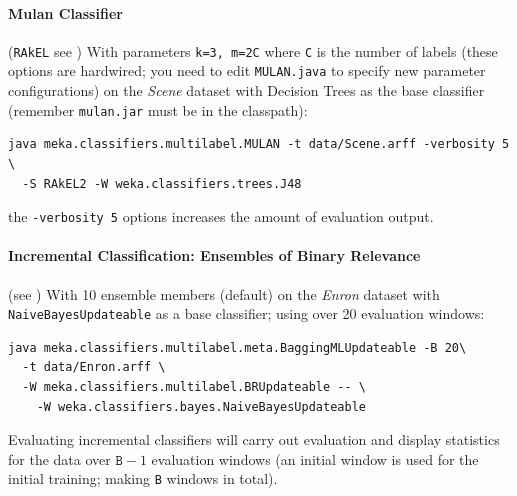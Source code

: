 \documentclass[11pt]{article}
\newcommand{\MEKA}{Meka}
\newcommand{\MOA}{Moa}
\begin{document}
\paragraph{Mulan Classifier} (\texttt{RAkEL} see \cite{RAKEL}) With parameters \texttt{\texttt{k=3}, \texttt{m=2C}} where \texttt{C} is the number of labels (these options are hardwired; you need to edit \texttt{MULAN.java} to specify new parameter configurations) on the \textit{Scene} dataset with Decision Trees as the base classifier (remember {\texttt{mulan.jar} must be in the classpath}):
\begin{lstlisting}
java meka.classifiers.multilabel.MULAN -t data/Scene.arff -verbosity 5 \ 
  -S RAkEL2 -W weka.classifiers.trees.J48
\end{lstlisting}
the \texttt{-verbosity 5} options increases the amount of evaluation output.



\paragraph{Incremental Classification: Ensembles of Binary Relevance} (see \cite{ECC2,MEDS2}) With 10 ensemble members (default) on the \textit{Enron} dataset with \texttt{NaiveBayesUpdateable} as a base classifier; using over 20 evaluation windows:

\begin{lstlisting}
java meka.classifiers.multilabel.meta.BaggingMLUpdateable -B 20\
  -t data/Enron.arff \
  -W meka.classifiers.multilabel.BRUpdateable -- \
    -W weka.classifiers.bayes.NaiveBayesUpdateable
\end{lstlisting}

Evaluating incremental classifiers will carry out evaluation and display statistics for the data over $\texttt{B}-1$ evaluation windows (an initial window is used for the initial training; making \texttt{B} windows in total). %
\end{document}
